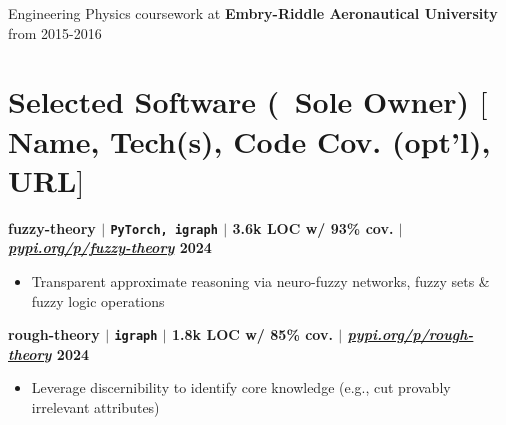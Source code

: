 \documentclass[11pt]{article} %
\begin{document}
\vspace{-4pt}
\noindent
Engineering Physics coursework at \textbf{Embry-Riddle Aeronautical University} from 2015-2016



\vspace{-12pt}

\section{Selected Software (\dag $\,$ Sole Owner) {\normalfont\footnotesize $[$Name, Tech(s), Code Cov. (opt'l), URL$]$}}
\vspace{-8pt}
\noindent\textbf{fuzzy-theory\textsuperscript{\dag} $|$ \texttt{PyTorch, igraph} $|$ {\normalfont3.6k LOC w/ 93\% cov.} $|$ \href{https://pypi.org/p/fuzzy-theory}
{\normalfont\textit{pypi.org/p/fuzzy-theory}} \hfill 2024}
\vspace{-6pt}
\begin{itemize}
\setlength\itemsep{-0.5em}
  \item Transparent approximate reasoning via neuro-fuzzy networks, fuzzy sets \& fuzzy logic operations
\end{itemize}

\vspace{-4pt}

\noindent\textbf{rough-theory\textsuperscript{\dag} $|$ \texttt{igraph} $|$ {\normalfont1.8k LOC w/ 85\% cov.} $|$ \href{https://pypi.org/p/rough-theory}
{\normalfont\textit{pypi.org/p/rough-theory}} \hfill 2024}
\vspace{-6pt}
\begin{itemize}
\setlength\itemsep{-0.5em}
  \item Leverage discernibility to identify core knowledge (e.g., cut provably irrelevant attributes)
\end{itemize}
\end{document}
